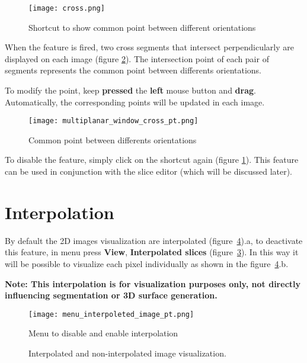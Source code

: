 \begin{figure}[!htb]
\centering
\texttt{[image: cross.png]}
\caption{Shortcut to show common point between different orientations}
\label{fig:cross_icon}
\end{figure}

When the feature is fired, two cross segments that intersect perpendicularly are displayed on each image (figure \ref{fig:cross_all}). The intersection point of each pair of segments represents the common point between differents orientations.

\newpage

To modify the point, keep \textbf{pressed} the \textbf{left} mouse button and
\textbf{drag}. Automatically, the corresponding points will be updated in each image.

\begin{figure}[!htb]
\centering
\texttt{[image: multiplanar\_window\_cross\_pt.png]}
\caption{Common point between differents orientations}
\label{fig:cross_all}
\end{figure}

To disable the feature, simply click on the shortcut again (figure \ref{fig:cross_icon}). This feature can be used in conjunction with the slice editor (which will be discussed later).

\section{Interpolation}

By default the 2D images visualization are interpolated (figure~\ref{fig:interp}).a, to deactivate this feature, in menu press \textbf{View}, \textbf{Interpolated slices} (figure~\ref{fig:menu_interpoleted_image_pt}). In this way it will be possible to visualize each pixel individually as shown in the figure~\ref{fig:interp}.b.

\textbf{Note: This interpolation is for visualization purposes only, not directly influencing segmentation or 3D surface generation.}

\begin{figure}[!htb]
\centering
\texttt{[image: menu\_interpoleted\_image\_pt.png]}
\caption{Menu to disable and enable interpolation}
\label{fig:menu_interpoleted_image_pt}
\end{figure}


\begin{figure}[!htb]
  \centering
    \qquad
  \hfill
  \caption{Interpolated and non-interpolated image visualization.}
  \label{fig:interp}
\end{figure}


